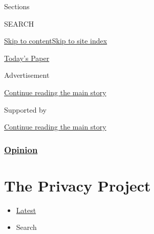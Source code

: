 Sections

SEARCH

\protect\hyperlink{site-content}{Skip to
content}\protect\hyperlink{site-index}{Skip to site index}

\href{https://myaccount.nytimes3xbfgragh.onion/auth/login?response_type=cookie\&client_id=vi}{}

\href{https://www.nytimes3xbfgragh.onion/section/todayspaper}{Today's
Paper}

Advertisement

\protect\hyperlink{after-top}{Continue reading the main story}

Supported by

\protect\hyperlink{after-sponsor}{Continue reading the main story}

\hypertarget{opinion}{%
\subsubsection{\texorpdfstring{\href{/section/opinion}{Opinion}}{Opinion}}\label{opinion}}

\hypertarget{the-privacy-project}{%
\section{The Privacy Project}\label{the-privacy-project}}

\begin{itemize}
\tightlist
\item
  \protect\hyperlink{stream-panel}{Latest}
\item
  Search
\end{itemize}

